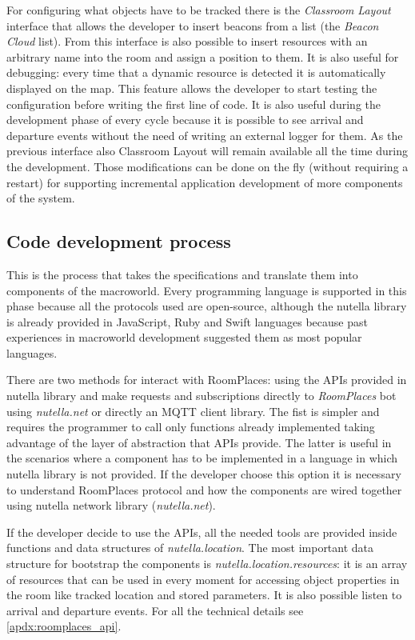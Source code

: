 For configuring what objects have to be tracked there is the \textit{Classroom Layout} interface that allows the developer to insert beacons from a list (the \textit{Beacon Cloud} list). From this interface is also possible to insert resources with an arbitrary name into the room and assign a position to them. It is also useful for debugging: every time that a dynamic resource is detected it is automatically displayed on the map. This feature allows the developer to start testing the configuration before writing the first line of code. It is also useful during the development phase of every cycle because it is possible to see arrival and departure events without the need of writing an external logger for them. As the previous interface also Classroom Layout will remain available all the time during the development. Those modifications can be done on the fly (without requiring a restart) for supporting incremental application development of more components of the system.

\subsection{Code development process}
This is the process that takes the specifications and translate them into components of the macroworld. Every programming language is supported in this phase because all the protocols used are open-source, although the nutella library is already provided in JavaScript, Ruby and Swift languages because past experiences in macroworld development suggested them as most popular languages.

There are two methods for interact with RoomPlaces: using the APIs provided in nutella library and make requests and subscriptions directly to \textit{RoomPlaces} bot using \textit{nutella.net} or directly an MQTT client library. The fist is simpler and requires the programmer to call only functions already implemented taking advantage of the layer of abstraction that APIs provide. The latter is useful in the scenarios where a component has to be implemented in a language in which nutella library is not provided. If the developer choose this option it is necessary to understand  RoomPlaces protocol and how the components are wired together using nutella network library (\textit{nutella.net}).

If the developer decide to use the APIs, all the needed tools are provided inside functions and data structures of \textit{nutella.location}. The most important data structure for bootstrap the components is \textit{nutella.location.resources}: it is an array of resources that can be used in every moment for accessing object properties in the room like tracked location and stored parameters. It is also possible listen to arrival and departure events. For all the technical details see \autoref{apdx:roomplaces_api}.

